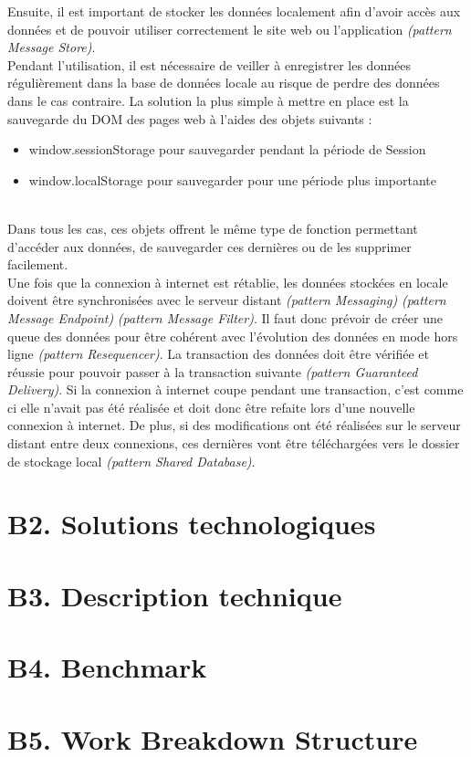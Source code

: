 	Ensuite, il est important de stocker les données localement afin d’avoir accès aux données et de pouvoir utiliser correctement le site web ou l’application \textit{(pattern Message Store)}. \\

	Pendant l’utilisation, il est nécessaire de veiller à enregistrer les données régulièrement dans la base de données locale au risque de perdre des données dans le cas contraire. La solution la plus simple à mettre en place est la sauvegarde du DOM des pages web à l’aides des objets suivants :

	\begin{itemize}
		\item window.sessionStorage pour sauvegarder pendant la période de Session
		\item window.localStorage pour sauvegarder pour une période plus importante
	\end{itemize}
	~\\

	Dans tous les cas, ces objets offrent le même type de fonction permettant d'accéder aux données, de sauvegarder ces dernières ou de les supprimer facilement.\\

	Une fois que la connexion à internet est rétablie, les données stockées en locale doivent être synchronisées avec le serveur distant \textit{(pattern Messaging)} \textit{(pattern Message Endpoint)} \textit{(pattern Message Filter)}. Il faut donc prévoir de créer une queue des données pour être cohérent avec l’évolution des données en mode hors ligne \textit{(pattern Resequencer)}. La transaction des données doit être vérifiée et réussie pour pouvoir passer à la transaction suivante \textit{(pattern Guaranteed Delivery)}. Si la connexion à internet coupe pendant une transaction, c’est comme ci elle n’avait pas été réalisée et doit donc être refaite lors d’une nouvelle connexion à internet. De plus, si des modifications ont été réalisées sur le serveur distant entre deux connexions, ces dernières vont être téléchargées vers le dossier de stockage local \textit{(pattern Shared Database)}.

\section{B2. Solutions technologiques}

\section{B3. Description technique}

\section{B4. Benchmark}

\section{B5. Work Breakdown Structure}